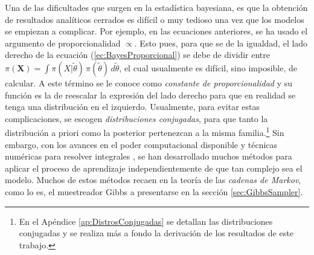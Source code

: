 \documentclass[../Main/Main.tex]{subfiles}
\begin{document}
Una de las dificultades que surgen en la estadística bayesiana, es que la obtención de resultados analíticos cerrados es difícil o muy tedioso una vez que los modelos se empiezan a complicar. Por ejemplo, en las ecuaciones anteriores, se ha usado el argumento de proporcionalidad $\propto$. Esto pues, para que se de la igualdad, el lado derecho de la ecuación (\ref{ec:BayesProporcional}) se debe de dividir entre $\pi(\mathbf{X}) = \int \pi(X|\tilde{\theta})\,\pi(\tilde{\theta})\,d\tilde{\theta}$, el cual usualmente es difícil, sino imposible, de calcular. A este término se le conoce como \textit{constante de proporcionalidad} y su función es la de reescalar la expresión del lado derecho para que en realidad se tenga una distribución en el izquierdo. Usualmente, para evitar estas complicaciones, se escogen \textit{distribuciones conjugadas}, para que tanto la distribución a priori como la posterior pertenezcan a la misma familia.\footnote{En el Apéndice \ref{ap:DistrosConjugadas} se detallan las distribuciones conjugadas y se realiza más a fondo la derivación de los resultados de este trabajo.} Sin embargo, con los avances en el poder computacional disponible y técnicas numéricas para resolver integrales \autocite{robert2004monte}, se han desarrollado muchos métodos para aplicar el proceso de aprendizaje independientemente de que tan complejo sea el modelo. Muchos de estos métodos recaen en la teoría de las \textit{cadenas de Markov}, como lo es, el muestreador Gibbs a presentarse en la sección \ref{sec:GibbsSampler}. 
\end{document}
